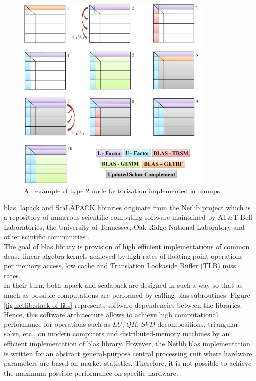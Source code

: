 \figpointer{\ref{fig:mumps:steps-of-type-2-factorization}}
\begin{figure}[htpb]
  \centering
  \includegraphics[width=0.85\textwidth]{figures/chapter-2/mumps-type-2-part-1.png}
\caption{An example of type 2 node factorization implemented in \acrshort{mumps}}
\label{fig:mumps:steps-of-type-2-factorization}
\end{figure}


\acrshort{blas}, \acrshort{lapack} and ScaLAPACK libraries originate from the Netlib project which is a repository of numerous scientific computing software maintained by AT\&T Bell Laboratories, the University of Tennessee, Oak Ridge National Laboratory and other scintific communities \cite{netlib-overview}.\\


The goal of \acrshort{blas} library is provision of high efficient implementations of common dense linear algebra kernels achieved by high rates of floating point operations per memory access, low cache and Translation Lookaside Buffer (TLB) miss rates.\\


In their turn, both \acrshort{lapack} and \acrshort{scalapack} are designed in such a way so that as much as possible computations are performed by calling \acrshort{blas} subroutines. Figure \ref{fig:netlib:stack-of-libs} represents software dependencies between the libraries. Hence, this software architecture allows to achieve high computational performance for operations such as $LU$, $QR$, $SVD$ decompositions, triangular solve, etc., on modern computers and distributed-memory machines by an efficient implementation of \acrshort{blas} library. However, the Netlib \acrshort{blas} implementation is written for an abstract general-purpose central processing unit where hardware parameters are based on market statistics. Therefore, it is not possible to achieve the maximum possible performance on specific hardware.\\


